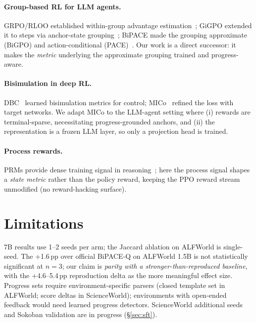 \documentclass[sigconf]{acmart}
\begin{document}
\paragraph{Group-based RL for LLM agents.} GRPO/RLOO established
within-group advantage estimation~\cite{grpo,rloo}; GiGPO extended it
to steps via anchor-state grouping~\cite{gigpo}; BiPACE made the
grouping approximate (BiGPO) and action-conditional
(PACE)~\cite{bipace}. Our work is a direct successor: it makes the
\emph{metric} underlying the approximate grouping trained and
progress-aware.

\paragraph{Bisimulation in deep RL.} DBC~\cite{dbc} learned
bisimulation metrics for control; MICo~\cite{micobisim} refined the
loss with target networks. We adapt MICo to the LLM-agent setting where
(i) rewards are terminal-sparse, necessitating progress-grounded
anchors, and (ii) the representation is a frozen LLM layer, so only a
projection head is trained.

\paragraph{Process rewards.} PRMs provide dense training signal in
reasoning~\cite{prm}; here the process signal shapes a \emph{state
metric} rather than the policy reward, keeping the PPO reward stream
unmodified (no reward-hacking surface).

\section{Limitations}
\label{sec:limitations}

7B results use 1--2 seeds per arm; the Jaccard ablation on ALFWorld is
single-seed. The +1.6\,pp over official BiPACE-Q on ALFWorld 1.5B is
not statistically significant at $n{=}3$; our claim is \emph{parity
with a stronger-than-reproduced baseline}, with the +4.6--5.4\,pp
reproduction delta as the more meaningful effect size. Progress sets
require environment-specific parsers (closed template set in ALFWorld;
score deltas in ScienceWorld);
environments with open-ended feedback would need learned progress
detectors. ScienceWorld additional seeds and Sokoban validation are in
progress (\S\ref{sec:sft}).

\end{document}
